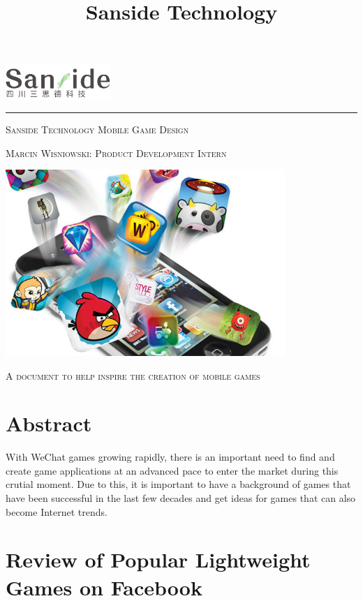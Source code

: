 \documentclass{article}
\begin{document}
\title{Sanside Technology}
\begin{titlepage}
    \includegraphics[width = 150px]{images/SansideLogo.png}
    \hfill
    \hrule
    \vspace{2cm}
    \centering
	{\scshape\LARGE Sanside Technology Mobile Game Design\par}
	\vspace{0.5cm}
	{\scshape Marcin Wisniowski: Product Development Intern \par}
    \vspace{2cm}
    \begin{center}
    \includegraphics[width = 400px]{images/mobile_game.jpg}
    \end{center}
    \vspace{0.5cm}
    {\scshape A document to help inspire the creation of mobile games}
\end{titlepage}

\section{Abstract}
With WeChat games growing rapidly, there is an important need to find and create game applications at an advanced pace to enter the market during this crutial moment. Due to this, it is important to have a background of games that have been successful in the last few decades and get ideas for games that can also become Internet trends.

\tableofcontents

\newpage
{}

\section{Review of Popular Lightweight Games on Facebook}
\end{document}
